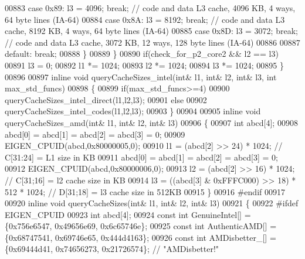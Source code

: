 \begin{DoxyCode}
{00883       \textcolor{keywordflow}{case} 0x89: l3 = 4096; \textcolor{keywordflow}{break};   \textcolor{comment}{// code and data L3 cache, 4096 KB, 4 ways, 64 byte lines (IA-64)}
00884       \textcolor{keywordflow}{case} 0x8A: l3 = 8192; \textcolor{keywordflow}{break};   \textcolor{comment}{// code and data L3 cache, 8192 KB, 4 ways, 64 byte lines (IA-64)}
00885       \textcolor{keywordflow}{case} 0x8D: l3 = 3072; \textcolor{keywordflow}{break};   \textcolor{comment}{// code and data L3 cache, 3072 KB, 12 ways, 128 byte lines (IA-64)}
00886 
00887       \textcolor{keywordflow}{default}: \textcolor{keywordflow}{break};
00888     \}
00889   \}
00890   \textcolor{keywordflow}{if}(check\_for\_p2\_core2 && l2 == l3)
00891     l3 = 0;
00892   l1 *= 1024;
00893   l2 *= 1024;
00894   l3 *= 1024;
00895 \}
00896 
00897 \textcolor{keyword}{inline} \textcolor{keywordtype}{void} queryCacheSizes\_intel(\textcolor{keywordtype}{int}& l1, \textcolor{keywordtype}{int}& l2, \textcolor{keywordtype}{int}& l3, \textcolor{keywordtype}{int} max\_std\_funcs)
00898 \{
00899   \textcolor{keywordflow}{if}(max\_std\_funcs>=4)
00900     queryCacheSizes\_intel\_direct(l1,l2,l3);
00901   \textcolor{keywordflow}{else}
00902     queryCacheSizes\_intel\_codes(l1,l2,l3);
00903 \}
00904 
00905 \textcolor{keyword}{inline} \textcolor{keywordtype}{void} queryCacheSizes\_amd(\textcolor{keywordtype}{int}& l1, \textcolor{keywordtype}{int}& l2, \textcolor{keywordtype}{int}& l3)
00906 \{
00907   \textcolor{keywordtype}{int} abcd[4];
00908   abcd[0] = abcd[1] = abcd[2] = abcd[3] = 0;
00909   EIGEN\_CPUID(abcd,0x80000005,0);
00910   l1 = (abcd[2] >> 24) * 1024; \textcolor{comment}{// C[31:24] = L1 size in KB}
00911   abcd[0] = abcd[1] = abcd[2] = abcd[3] = 0;
00912   EIGEN\_CPUID(abcd,0x80000006,0);
00913   l2 = (abcd[2] >> 16) * 1024; \textcolor{comment}{// C[31;16] = l2 cache size in KB}
00914   l3 = ((abcd[3] & 0xFFFC000) >> 18) * 512 * 1024; \textcolor{comment}{// D[31;18] = l3 cache size in 512KB}
00915 \}
00916 \textcolor{preprocessor}{#endif}
00917 
00920 \textcolor{keyword}{inline} \textcolor{keywordtype}{void} queryCacheSizes(\textcolor{keywordtype}{int}& l1, \textcolor{keywordtype}{int}& l2, \textcolor{keywordtype}{int}& l3)
00921 \{
00922 \textcolor{preprocessor}{  #ifdef EIGEN\_CPUID}
00923   \textcolor{keywordtype}{int} abcd[4];
00924   \textcolor{keyword}{const} \textcolor{keywordtype}{int} GenuineIntel[] = \{0x756e6547, 0x49656e69, 0x6c65746e\};
00925   \textcolor{keyword}{const} \textcolor{keywordtype}{int} AuthenticAMD[] = \{0x68747541, 0x69746e65, 0x444d4163\};
00926   \textcolor{keyword}{const} \textcolor{keywordtype}{int} AMDisbetter\_[] = \{0x69444d41, 0x74656273, 0x21726574\}; \textcolor{comment}{// "AMDisbetter!"}
}
\end{DoxyCode}
